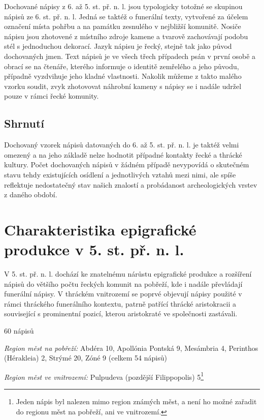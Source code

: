 Dochované nápisy z 6. až 5. st. př. n. l. jsou typologicky totožné se skupinou nápisů ze 6. st. př. n. l. Jedná se taktéž o funerální texty, vytvořené za účelem označení místa pohřbu a na památku zesnulého v nejbližší komunitě. Nosiče nápisu jsou zhotovené z místního zdroje kamene a tvarově zachovávají podobu stél s jednoduchou dekorací. Jazyk nápisu je řecký, stejně tak jako původ dochovaných jmen. Text nápisů je ve všech třech případech psán v první osobě a obrací se na čtenáře, kterého informuje o identitě zemřelého a jeho původu, případně vyzdvihuje jeho kladné vlastnosti. Nakolik můžeme z takto malého vzorku soudit, zvyk zhotovovat náhrobní kameny s nápisy se i nadále udržel pouze v rámci řecké komunity.

\subsection[shrnutí-4]{Shrnutí}

Dochovaný vzorek nápisů datovaných do 6. až 5. st. př. n. l. je taktéž velmi omezený a na jeho základě nelze hodnotit případné kontakty řecké a thrácké kultury. Počet dochovaných nápisů v žádném případě nevypovídá o skutečném stavu tehdy existujících osídlení a jednotlivých vztahů mezi nimi, ale spíše reflektuje nedostatečný stav našich znalostí a probádanost archeologických vrstev z daného období.

\section[charakteristika-epigrafické-produkce-v-5.-st.-př.-n.-l.]{Charakteristika epigrafické produkce v 5. st. př. n. l.}

V 5. st. př. n. l. dochází ke znatelnému nárůstu epigrafické produkce a rozšíření nápisů do většího počtu řeckých komunit na pobřeží, kde i nadále převládají funerální nápisy. V thráckém vnitrozemí se poprvé objevují nápisy použité v rámci thráckého funerálního kontextu, patrně patřící thrácké aristokracii a související s prominentní pozicí, kterou aristokraté ve společnosti zastávali.

\placetable[none]{}
\starttable[|l|]
\HL
{} 60 nápisů

{\em Region měst na pobřeží:} Abdéra 10, Apollónia Pontská 9, Mesámbria 4, Perinthos (Hérakleia) 2, Strýmé 20, Zóné 9 (celkem 54 nápisů)

{\em Region měst ve vnitrozemí:} Pulpudeva (pozdější Filippopolis) 5\footnote{Jeden nápis byl nalezen mimo region známých měst, a není ho možné zařadit do regionu měst na pobřeží, ani ve vnitrozemí.}


